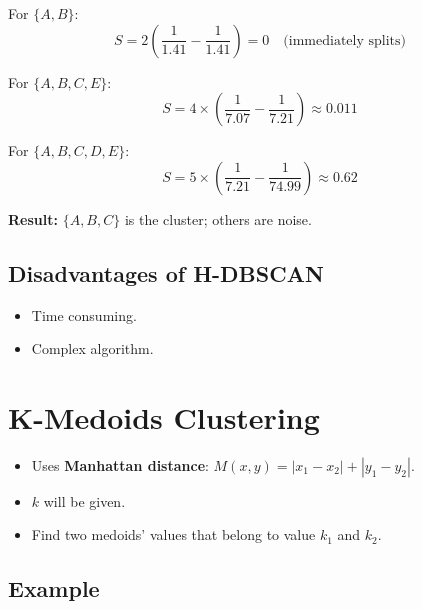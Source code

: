 \documentclass[12pt,a4paper]{article}
\begin{document}
\begin{examplebox}
For $\{A,B\}$:
\[
S = 2\left(\frac{1}{1.41} - \frac{1}{1.41}\right) = 0 \quad \text{(immediately splits)}
\]

For $\{A,B,C,E\}$:
\[
S = 4 \times \left(\frac{1}{7.07} - \frac{1}{7.21}\right) \approx 0.011
\]

For $\{A,B,C,D,E\}$:
\[
S = 5 \times \left(\frac{1}{7.21} - \frac{1}{74.99}\right) \approx 0.62
\]

\textbf{Result:} $\{A,B,C\}$ is the cluster; others are noise.
\end{examplebox}

\subsection{Disadvantages of H-DBSCAN}
\begin{itemize}
  \item Time consuming.
  \item Complex algorithm.
\end{itemize}

\section{K-Medoids Clustering}

\begin{definitionbox}[K-Medoids]
\begin{itemize}
  \item Uses \textbf{Manhattan distance}: $M(x,y) = |x_1 - x_2| + |y_1 - y_2|$.
  \item $k$ will be given.
  \item Find two medoids' values that belong to value $k_1$ and $k_2$.
\end{itemize}
\end{definitionbox}

\subsection{Example}
\end{document}
